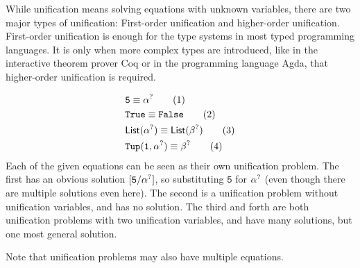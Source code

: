 \documentclass[twoside,12pt,a4paper]{article}
\begin{document}
While unification means solving equations with unknown variables, there are two major types of unification: First-order unification and higher-order unification.
First-order unification is enough for the type systems in most typed programming languages. It is only when more complex types are introduced, 
like in the interactive theorem prover Coq or in the programming language Agda, that higher-order unification is required.

\begin{example}
    \begin{align*}
        &\mathtt{5} \equiv \alpha^?\tag{1}\\
        &\mathtt{True \equiv False}\tag{2}\\
        &\mathsf{List(\alpha^?)\equiv List(\beta^?)}\tag{3}\\
        &\mathtt{Tup(1,\alpha^?)}\equiv \beta^? \tag{4}
    \end{align*}
    Each of the given equations can be seen as their own unification problem.
    The first has an obvious solution $[\mathtt{5/\alpha^?}]$, so substituting $\mathtt{5}$ for $\alpha^?$ (even though there are multiple solutions even here).
    The second is a unification problem without unification variables, and has no solution.
    The third and forth are both unification problems with two unification variables, and have many solutions, but one most general solution.
\end{example}
Note that unification problems may also have multiple equations.
\end{document}

